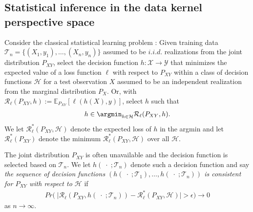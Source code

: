 

\subsection{Statistical inference in the data kernel perspective space}
\label{subsec:inference}

Consider the classical statistical learning problem \citep[Chapter~2]{hastie2009elements}:
Given training data $ \mathcal{T}_{n} = \{ (X_{1}, y_{1}), \hdots, (X_{n}, y_{n}) \} $ assumed to be  $ i.i.d. $ realizations from the joint distribution $ P_{XY} $, select the decision function $ h: \mathcal{X} \to \mathcal{Y} $ that minimizes the expected value of a loss function $ \ell $ with respect to $ P_{XY} $ within a class of decision functions $ \mathcal{H} $ for a test observation $ X $ assumed to be an independent realization from the marginal distribution $ P_{X}$. Or, with $ \mathcal{R}_{\ell}(P_{XY}, h) := \mathbb{E}_{P_{XY}}\left[\ell(h(X), y)\right] $, select $ h $ such that \begin{align*}
\label{eq:risk}
    h \in \argmin_{h \in \mathcal{H}} \mathcal{R}_{\ell}(P_{XY}, h). 
\end{align*}
We let $ \mathcal{R}_{\ell}^{*}(P_{XY}, \mathcal{H}) $ denote the expected loss of $ h $ in the argmin and let $ \mathcal{R}^{*}_{\ell}(P_{XY}) $ denote the minimum $ \mathcal{R}_{\ell}^{*}(P_{XY}, \mathcal{H}) $ over all $ \mathcal{H} $.

The joint distribution $ P_{XY} $ is often unavailable and the decision function is selected based on $ \mathcal{T}_{n} $. 
We let $ h(\; \cdot \;; \mathcal{T}_{n}) $ denote such a decision function and say \textit{the sequence of decision functions $ \left(h(\; \cdot \;; \mathcal{T}_{1}), \hdots, h(\;\cdot\;; \mathcal{T}_{n})\right) $ is consistent for $ P_{XY} $ with respect to $ \mathcal{H}$} if \begin{align*}
Pr\big(\;\big|  \mathcal{R}_{\ell}(P_{XY}, h(\;\cdot\;; \mathcal{T}_{n})) - \mathcal{R}^{*}_{\ell}(P_{XY}, \mathcal{H}) \big| > \epsilon\big) \to 0
\end{align*} as $ n \to \infty $.

